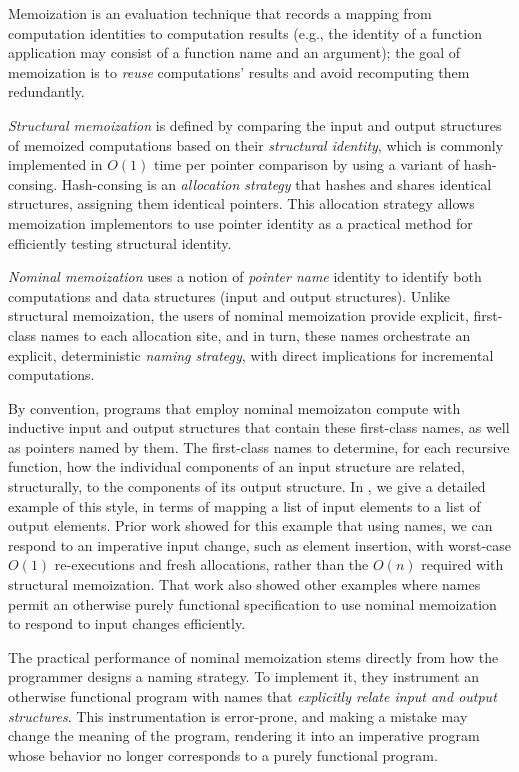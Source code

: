 \documentclass{purple}
\begin{document}
Memoization is an evaluation technique that records a mapping
from computation identities to computation results (e.g., the identity
of a function application may consist of a function name and an
argument); the goal of memoization is to \emph{reuse} computations'
results and avoid recomputing them redundantly.

\emph{Structural memoization} is defined by comparing the input and
output structures of memoized computations based on their
\emph{structural identity}, which is commonly implemented in $O(1)$
time per pointer comparison by using a variant of hash-consing.
%
Hash-consing is an \emph{allocation strategy} that hashes and shares
identical structures, assigning them identical pointers.  This
allocation strategy allows memoization implementors to use pointer
identity as a practical method for efficiently testing structural
identity.

\emph{Nominal memoization} uses a notion of \emph{pointer name}
identity to identify both computations and data structures (input and
output structures).
%
Unlike structural memoization, the users of nominal memoization
provide explicit, first-class names to each allocation site, and in
turn, these names orchestrate an explicit, deterministic \emph{naming
  strategy}, with direct implications for incremental computations.
%

By convention, programs that employ nominal memoizaton compute with
inductive input and output structures that contain these first-class
names, as well as pointers named by them.
%
The first-class names to determine, for each recursive function, how
the individual components of an input structure are related,
structurally, to the components of its output structure.
%
In , we give a detailed example of this style, in
terms of mapping a list of input elements to a list of output
elements.
%
Prior work showed for this example that using names, we can respond to
an imperative input change, such as element insertion, with worst-case
$O(1)$ re-executions and fresh allocations, rather than the $O(n)$
required with structural memoization.
%
That work also showed other examples where names permit an otherwise
purely functional specification to use nominal memoization to respond
to input changes efficiently.

The practical performance of nominal memoization stems directly from
how the programmer designs a naming strategy.
%
To implement it, they instrument an otherwise functional program with
names that \emph{explicitly relate input and output structures}.
%
This instrumentation is error-prone, and making a mistake may change
the meaning of the program, rendering it into an imperative program
whose behavior no longer corresponds to a purely functional program.
\end{document}
